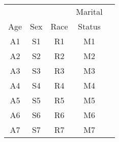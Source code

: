 % 
\begin{tabular}{ccccc}
     &     &      & Marital \\
 Age & Sex & Race & Status \\
 A1  & S1  & R1   & M1  \\
 A2  & S2  & R2   & M2  \\
 A3  & S3  & R3   & M3  \\
 A4  & S4  & R4   & M4  \\
 A5  & S5  & R5   & M5  \\
 A6  & S6  & R6   & M6  \\
 A7  & S7  & R7   & M7  \\
\hline
\end{tabular}
